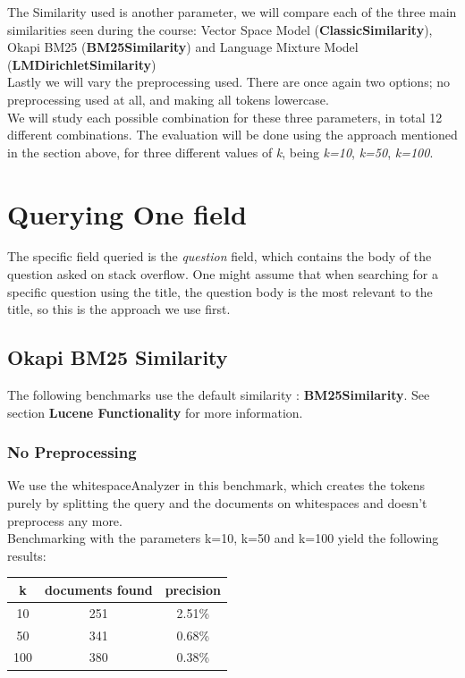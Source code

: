 \documentclass{article}
\begin{document}
The Similarity used is another parameter, we will compare each of the three main similarities seen during the course: Vector Space Model (\textbf{ClassicSimilarity}), Okapi BM25 (\textbf{BM25Similarity}) and Language Mixture Model (\textbf{LMDirichletSimilarity})\\

Lastly we will vary the preprocessing used. There are once again two options; no preprocessing used at all, and making all tokens lowercase.\\

We will study each possible combination for these three parameters, in total 12 different combinations. The evaluation will be done using the approach mentioned in the section above, for three different values of \textit{k}, being \textit{k=10}, \textit{k=50}, \textit{k=100}.

\section{Querying One field}
The specific field queried is the \textit{question} field, which contains the body of the question asked on stack overflow. One might assume that when searching for a specific question using the title, the question body is the most relevant to the title, so this is the approach we use first.

\subsection{Okapi BM25 Similarity}
The following benchmarks use the default similarity : \textbf{BM25Similarity}. See section \textbf{Lucene Functionality} for more information.
\subsubsection{No Preprocessing}
We use the whitespaceAnalyzer in this benchmark, which creates the tokens purely by splitting the query and the documents on whitespaces and doesn't preprocess any more. \\
Benchmarking with the parameters k=10, k=50 and k=100 yield the following results:\\

\begin{center}
\begin{tabular}{|c|c|c|} \hline
\textbf{k} & \textbf{documents found} & \textbf{precision}\\ \hline
10 & 251 & 2.51\%\\
50 & 341 & 0.68\%\\
100 & 380 & 0.38\%\\ \hline
\end{tabular}
\end{center}
\end{document}
